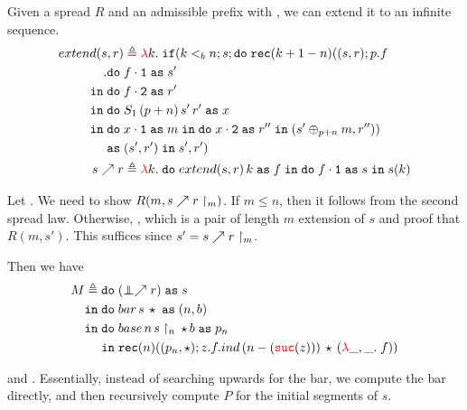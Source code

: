Given a spread $R$ and an admissible prefix  with , 
we can extend it to an infinite sequence. 
\begin{align*}
  extend(s,r) &\triangleq \lam{k}{}{
  \ifthen{k <_b n}{s}{
  \bind{
  \rec{k+1-n}{(s,r)}{p}{f\\}{
    \bind{&\fst{f}}{s'\\}{
      \bind{&\snd{f}}{r'\\}{
        \bind{&S_1\,(p+n)\,s'\,r'}{x\\}{
          \bind{&\fst{x}}{m}{
          \bind{\snd{x}}{r''}{
            (s' \oplus_{p+n} m, r'')
          }
        }
      }
      }
    }
  }\\
}{&(s',r')}{s', r'}
  }
}\\
  \extSeq{s}{r} &\triangleq \lam{k}{}{\bind{extend(s,r)\,k}{f}{
    \bind{\fst{f}}{s}{s(k)}}}
\end{align*}

Let . We need to show $R(m, s \nearrow r\restriction_m)$.
If $m \le n$, then it follows from the second spread law. 
Otherwise, , which is a pair of 
length $m$ extension of $s$ and proof that $R(m, s')$. 
This suffices since $s' = s \nearrow r\restriction_m$.

Then we have 
\begin{align*}
  M \triangleq \bind{&(\extSeq{\empseq}{r})}{s\\}{
    \bind{&bar\,s\,\triv}{(n,b)\\}{
    \bind{
      &base\,n\,s\restriction_n\,\triv\,b
    }{p_n\\}{
      &\rec{n}{(p_n,\triv)}{z}{f}{ind\,(n-(\suc{z}))\,\triv\,(\lam{\_,\_}{}{f})}
    }
  }
  }
\end{align*}

and . Essentially, instead of searching upwards for the bar, we compute 
the bar directly, and then recursively compute $P$ for the initial segments of $s$.
